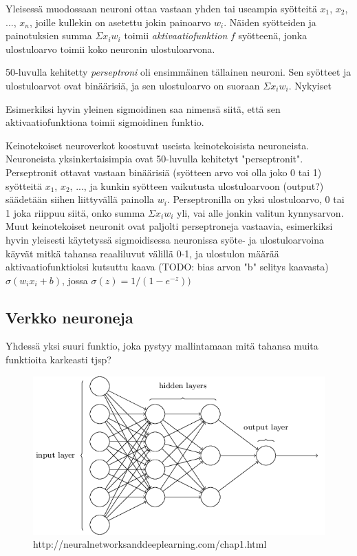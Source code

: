 \documentclass[11pt]{article}
\theoremstyle{plain}
\theoremstyle{definition}
\begin{document}
    Yleisessä muodossaan neuroni ottaa vastaan yhden tai useampia syötteitä $x_1$, $x_2$, ..., $x_n$, joille kullekin on asetettu jokin painoarvo $w_i$. Näiden syötteiden ja painotuksien summa $\Sigma x_i w_i$ toimii \textit{aktivaatiofunktion} $f$ syötteenä, jonka ulostuloarvo toimii koko neuronin ulostuloarvona. 

    50-luvulla kehitetty \textit{perseptroni} oli ensimmäinen tällainen neuroni. Sen syötteet ja ulostuloarvot ovat binäärisiä, ja sen ulostuloarvo on suoraan $\Sigma x_i w_i$. Nykyiset 
    
    Esimerkiksi hyvin yleinen sigmoidinen saa nimensä siitä, että sen aktivaatiofunktiona toimii sigmoidinen funktio.


  Keinotekoiset neuroverkot koostuvat useista keinotekoisista neuroneista. Neuroneista yksinkertaisimpia ovat 50-luvulla kehitetyt "perseptronit".
  Perseptronit ottavat vastaan binäärisiä (syötteen arvo voi olla joko 0 tai 1) syötteitä $x_1$, $x_2$, ..., ja kunkin syötteen vaikutusta ulostuloarvoon (output?) säädetään siihen liittyvällä painolla $w_i$.
  Perseptronilla on yksi ulostuloarvo, 0 tai 1 joka riippuu siitä, onko summa $\Sigma x_i w_i$ yli, vai alle jonkin valitun kynnysarvon.
  Muut keinotekoiset neuronit ovat paljolti perseptroneja vastaavia, esimerkiksi hyvin yleisesti käytetyssä sigmoidisessa neuronissa syöte- ja ulostuloarvoina käyvät mitkä tahansa reaaliluvut välillä 0-1, ja ulostulon määrää aktivaatiofunktioksi kutsuttu kaava (TODO: bias arvon "b" selitys kaavasta) $\sigma(w_i x_i + b)$, jossa $\sigma(z) = 1/(1-e^{-z}))$\cite{Nielsen-neural}

  \subsection{Verkko neuroneja}

  Yhdessä yksi suuri funktio, joka pystyy mallintamaan mitä tahansa muita funktioita karkeasti tjsp?

  \begin{figure}[h]
  \centering
  \includegraphics[scale=0.5]{basic-neuralnet}
  \caption{http://neuralnetworksanddeeplearning.com/chap1.html}
  \end{figure}
\end{document}
